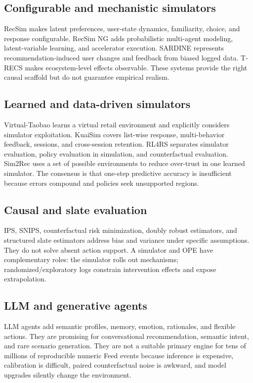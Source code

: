 \documentclass[10.5pt,a4paper]{article}
\begin{document}
\subsection{Configurable and mechanistic simulators}

RecSim makes latent preferences, user-state dynamics, familiarity, choice, and response configurable. RecSim NG adds probabilistic multi-agent modeling, latent-variable learning, and accelerator execution. SARDINE represents recommendation-induced user changes and feedback from biased logged data. T-RECS makes ecosystem-level effects observable. These systems provide the right causal scaffold but do not guarantee empirical realism.

\subsection{Learned and data-driven simulators}

Virtual-Taobao learns a virtual retail environment and explicitly considers simulator exploitation. KuaiSim covers list-wise response, multi-behavior feedback, sessions, and cross-session retention. RL4RS separates simulator evaluation, policy evaluation in simulation, and counterfactual evaluation. Sim2Rec uses a set of possible environments to reduce over-trust in one learned simulator. The consensus is that one-step predictive accuracy is insufficient because errors compound and policies seek unsupported regions.

\subsection{Causal and slate evaluation}

IPS, SNIPS, counterfactual risk minimization, doubly robust estimators, and structured slate estimators address bias and variance under specific assumptions. They do not solve absent action support. A simulator and OPE have complementary roles: the simulator rolls out mechanisms; randomized/exploratory logs constrain intervention effects and expose extrapolation.

\subsection{LLM and generative agents}

LLM agents add semantic profiles, memory, emotion, rationales, and flexible actions. They are promising for conversational recommendation, semantic intent, and rare scenario generation. They are not a suitable primary engine for tens of millions of reproducible numeric Feed events because inference is expensive, calibration is difficult, paired counterfactual noise is awkward, and model upgrades silently change the environment.
\end{document}
